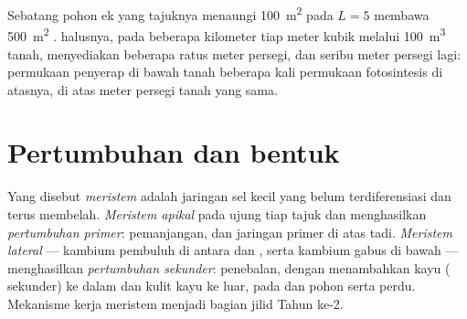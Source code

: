 \begin{example}\label{ex:b1:flowering-plant-organization:oaksurfaces}
Sebatang pohon ek yang tajuknya menaungi \qty{100}{m^2} pada $L = 5$
membawa \qty{500}{m^2} .  halusnya, pada beberapa kilometer tiap
meter kubik melalui \qty{100}{m^3} tanah, menyediakan beberapa ratus
meter persegi, dan  seribu meter persegi lagi: permukaan
penyerap di bawah tanah beberapa kali permukaan fotosintesis di atasnya,
di atas meter persegi tanah yang sama.
\end{example}

\section{Pertumbuhan dan bentuk}

\begin{definition}\label{def:b1:flowering-plant-organization:meristem}
Yang disebut \emph{meristem} adalah jaringan sel kecil
yang belum terdiferensiasi dan terus membelah. \emph{Meristem
apikal} pada ujung tiap tajuk dan 
menghasilkan \emph{pertumbuhan primer}:
pemanjangan, dan jaringan primer di atas tadi. \emph{Meristem
lateral} --- kambium pembuluh di antara 
dan , serta kambium gabus di bawah  --- menghasilkan
\emph{pertumbuhan sekunder}: penebalan,
dengan menambahkan kayu ( sekunder) ke dalam dan kulit kayu ke
luar, pada  dan  pohon serta perdu. Mekanisme kerja meristem
menjadi bagian jilid Tahun ke-2.
\end{definition}

